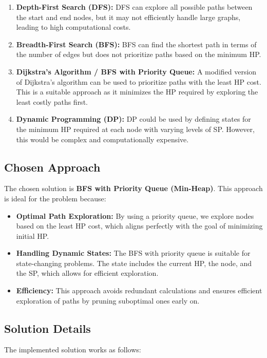\documentclass{article}
\begin{document}
\begin{enumerate}
    \item \textbf{Depth-First Search (DFS):} DFS can explore all possible paths between the start and end nodes, but it may not efficiently handle large graphs, leading to high computational costs.
    
    \item \textbf{Breadth-First Search (BFS):} BFS can find the shortest path in terms of the number of edges but does not prioritize paths based on the minimum HP.
    
    \item \textbf{Dijkstra’s Algorithm / BFS with Priority Queue:} A modified version of Dijkstra’s algorithm can be used to prioritize paths with the least HP cost. This is a suitable approach as it minimizes the HP required by exploring the least costly paths first.
    
    \item \textbf{Dynamic Programming (DP):} DP could be used by defining states for the minimum HP required at each node with varying levels of SP. However, this would be complex and computationally expensive.
\end{enumerate}

\subsection{Chosen Approach}
The chosen solution is \textbf{BFS with Priority Queue (Min-Heap)}. This approach is ideal for the problem because:

\begin{itemize}
    \item \textbf{Optimal Path Exploration:} By using a priority queue, we explore nodes based on the least HP cost, which aligns perfectly with the goal of minimizing initial HP.
    
    \item \textbf{Handling Dynamic States:} The BFS with priority queue is suitable for state-changing problems. The state includes the current HP, the node, and the SP, which allows for efficient exploration.
    
    \item \textbf{Efficiency:} This approach avoids redundant calculations and ensures efficient exploration of paths by pruning suboptimal ones early on.
\end{itemize}

\subsection{Solution Details}
The implemented solution works as follows:
\end{document}
